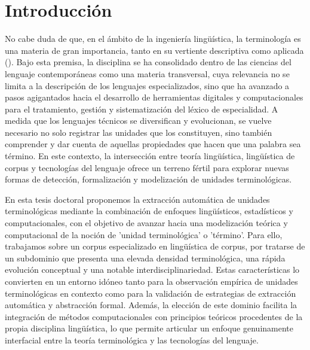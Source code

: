 \cleardoublepage
{}
\pagestyle{plain}

\chapter*{Introducción}
\label{chap:introduccion}

\fontsize{12}{14}\selectfont
\vspace{\baselineskip}



No cabe duda de que, en el ámbito de la ingeniería lingüística, la terminología es una materia de gran importancia, tanto en su vertiente descriptiva como aplicada (\cite{cabre2004termintegral}). Bajo esta premisa, la disciplina se ha consolidado dentro de las ciencias del lenguaje contemporáneas como una materia transversal, cuya relevancia no se limita a la descripción de los lenguajes especializados, sino que ha avanzado a pasos agigantados hacia el desarrollo de herramientas digitales y computacionales para el tratamiento, gestión y sistematización del léxico de especialidad. A medida que los lenguajes técnicos se diversifican y evolucionan, se vuelve necesario no solo registrar las unidades que los constituyen, sino también comprender y dar cuenta de aquellas propiedades que hacen que una palabra sea término. En este contexto, la intersección entre teoría lingüística, lingüística de corpus y tecnologías del lenguaje ofrece un terreno fértil para explorar nuevas formas de detección, formalización y modelización de unidades terminológicas.

En esta tesis doctoral proponemos la extracción automática de unidades terminológicas mediante la combinación de enfoques lingüísticos, estadísticos y computacionales, con el objetivo de avanzar hacia una modelización teórica y computacional de la noción de 'unidad terminológica' o 'término'. Para ello, trabajamos sobre un corpus especializado en lingüística de corpus, por tratarse de un subdominio que presenta una elevada densidad terminológica, una rápida evolución conceptual y una notable interdisciplinariedad. Estas características lo convierten en un entorno idóneo tanto para la observación empírica de unidades terminológicas en contexto como para la validación de estrategias de extracción automática y abstracción formal. Además, la elección de este dominio facilita la integración de métodos computacionales con principios teóricos procedentes de la propia disciplina lingüística, lo que permite articular un enfoque genuinamente interfacial entre la teoría terminológica y las tecnologías del lenguaje.

